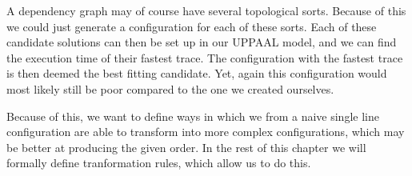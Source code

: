 A dependency graph may of course have several topological sorts. Because of this we could just generate a configuration for each of these sorts. Each of these candidate solutions can then be set up in our UPPAAL model, and we can find the execution time of their fastest trace. The configuration with the fastest trace is then deemed the best fitting candidate.  Yet, again this configuration would most likely still be poor compared to the one we created ourselves.

Because of this, we want to define ways in which we from a naive single line configuration are able to transform into more complex configurations, which may be better at producing the given order. In the rest of this chapter we will formally define tranformation rules, which allow us to do this. 








